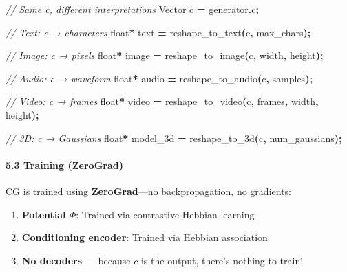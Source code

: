 \documentclass[
  11pt,
  a4paper,
]{article}
\newenvironment{Shaded}{\begin{snugshade}}{\end{snugshade}}
\newcommand{\CommentTok}[1]{\textcolor[rgb]{0.56,0.35,0.01}{\textit{#1}}}
\newcommand{\DataTypeTok}[1]{\textcolor[rgb]{0.13,0.29,0.53}{#1}}
\newcommand{\NormalTok}[1]{#1}
\newcommand{\OperatorTok}[1]{\textcolor[rgb]{0.81,0.36,0.00}{\textbf{#1}}}
\providecommand{\tightlist}{%
  \setlength{\itemsep}{0pt}\setlength{\parskip}{0pt}}
\begin{document}
\begin{Shaded}
\begin{Highlighting}[]
\CommentTok{// Same c, different interpretations}
\NormalTok{Vector c }\OperatorTok{=}\NormalTok{ generator}\OperatorTok{.}\NormalTok{c}\OperatorTok{;}

\CommentTok{// Text: c → characters}
\DataTypeTok{float}\OperatorTok{*}\NormalTok{ text }\OperatorTok{=}\NormalTok{ reshape\_to\_text}\OperatorTok{(}\NormalTok{c}\OperatorTok{,}\NormalTok{ max\_chars}\OperatorTok{);}

\CommentTok{// Image: c → pixels}
\DataTypeTok{float}\OperatorTok{*}\NormalTok{ image }\OperatorTok{=}\NormalTok{ reshape\_to\_image}\OperatorTok{(}\NormalTok{c}\OperatorTok{,}\NormalTok{ width}\OperatorTok{,}\NormalTok{ height}\OperatorTok{);}

\CommentTok{// Audio: c → waveform}
\DataTypeTok{float}\OperatorTok{*}\NormalTok{ audio }\OperatorTok{=}\NormalTok{ reshape\_to\_audio}\OperatorTok{(}\NormalTok{c}\OperatorTok{,}\NormalTok{ samples}\OperatorTok{);}

\CommentTok{// Video: c → frames}
\DataTypeTok{float}\OperatorTok{*}\NormalTok{ video }\OperatorTok{=}\NormalTok{ reshape\_to\_video}\OperatorTok{(}\NormalTok{c}\OperatorTok{,}\NormalTok{ frames}\OperatorTok{,}\NormalTok{ width}\OperatorTok{,}\NormalTok{ height}\OperatorTok{);}

\CommentTok{// 3D: c → Gaussians}
\DataTypeTok{float}\OperatorTok{*}\NormalTok{ model\_3d }\OperatorTok{=}\NormalTok{ reshape\_to\_3d}\OperatorTok{(}\NormalTok{c}\OperatorTok{,}\NormalTok{ num\_gaussians}\OperatorTok{);}
\end{Highlighting}
\end{Shaded}

\paragraph{5.3 Training (ZeroGrad)}\label{training-zerograd}

CG is trained using \textbf{ZeroGrad}---no backpropagation, no
gradients:

\begin{enumerate}
\def\labelenumi{\arabic{enumi}.}
\tightlist
\item
  \textbf{Potential \(\Phi\)}: Trained via contrastive Hebbian learning
\item
  \textbf{Conditioning encoder}: Trained via Hebbian association
\item
  \textbf{No decoders} --- because \(c\) is the output, there's nothing
  to train!
\end{enumerate}
\end{document}
